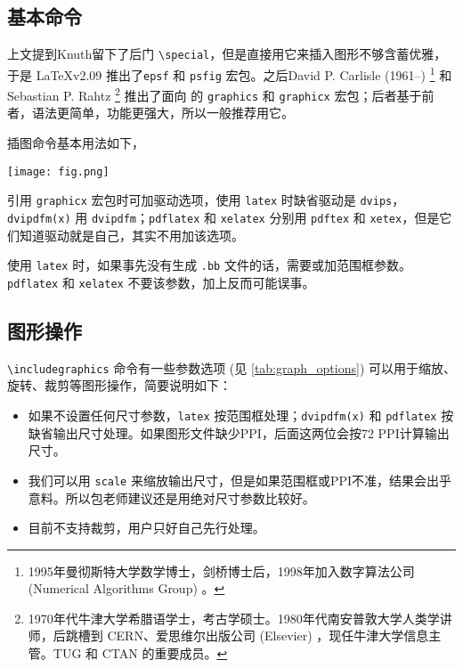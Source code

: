 \subsection{基本命令}

上文提到Knuth留下了后门 \verb|\special|，但是直接用它来插入图形不够含蓄优雅，于是 \LaTeX v2.09 推出了\texttt{epsf} 和 \texttt{psfig} 宏包。之后David P. Carlisle (1961--)\indexCarlisle{} \footnote{1995年曼彻斯特大学数学博士，剑桥博士后，1998年加入数字算法公司 (Numerical Algorithms Group) 。} 和Sebastian P. Rahtz\indexRahtz{} \footnote{1970年代牛津大学希腊语学士，考古学硕士。1980年代南安普敦大学人类学讲师，后跳槽到 CERN、爱思维尔出版公司 (Elsevier) ，现任牛津大学信息主管。TUG 和 CTAN 的重要成员。} 推出了面向 \LaTeXe 的 \texttt{graphics} 和 \texttt{graphicx} 宏包；后者基于前者，语法更简单，功能更强大，所以一般推荐用它。

插图命令基本用法如下，

\begin{Code}[]
\usepackage[dvipdfm]{graphicx}
\texttt{[image: fig.png]}
\end{Code}

引用 \texttt{graphicx} 宏包时可加驱动选项，使用 \texttt{latex} 时缺省驱动是 \texttt{dvips}，\texttt{dvipdfm(x)} 用 \texttt{dvipdfm}；\texttt{pdflatex} 和 \texttt{xelatex} 分别用 \texttt{pdftex} 和 \texttt{xetex}，但是它们知道驱动就是自己，其实不用加该选项。

使用 \texttt{latex} 时，如果事先没有生成 \texttt{.bb} 文件的话，需要或加范围框参数。\texttt{pdflatex} 和 \texttt{xelatex} 不要该参数，加上反而可能误事。

\subsection{图形操作}

\verb|\includegraphics| 命令有一些参数选项 (见 \autoref{tab:graph_options}) 可以用于缩放、旋转、裁剪等图形操作，简要说明如下：

\begin{itemize}
\item 如果不设置任何尺寸参数，\texttt{latex} 按范围框处理；\texttt{dvipdfm(x)} 和 \texttt{pdflatex} 按缺省输出尺寸处理。如果图形文件缺少PPI，后面这两位会按72 PPI计算输出尺寸。
\item 我们可以用 \texttt{scale} 来缩放输出尺寸，但是如果范围框或PPI不准，结果会出乎意料。所以包老师建议还是用绝对尺寸参数比较好。
\item \XeTeX 目前不支持裁剪，用户只好自己先行处理。
\end{itemize}

